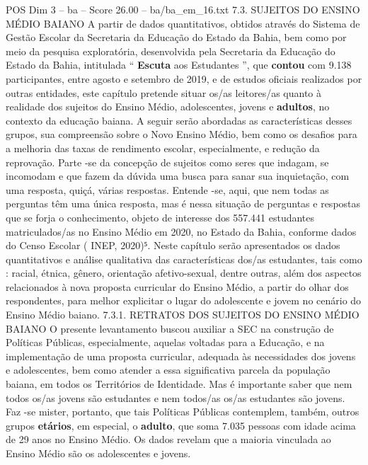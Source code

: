\begin{textsample}{POS Dim 3 – ba – Score 26.00 – ba/ba\_em\_16.txt}  \label{ex:f3_pos_172}
7.3.
SUJEITOS DO ENSINO MÉDIO BAIANO A partir de dados quantitativos, obtidos através do Sistema de Gestão Escolar da Secretaria da Educação do Estado da Bahia, bem como por meio da pesquisa exploratória, desenvolvida pela Secretaria da Educação do Estado da Bahia, intitulada “ \textbf{Escuta} aos Estudantes ”, que \textbf{contou} com 9.138 participantes, entre agosto e setembro de 2019, e de estudos oficiais realizados por outras entidades, este capítulo pretende situar os/as leitores/as quanto à realidade dos sujeitos do Ensino Médio, adolescentes, jovens e \textbf{adultos}, no contexto da educação baiana.
A seguir serão abordadas as características desses grupos, sua compreensão sobre o Novo Ensino Médio, bem como os desafios para a melhoria das taxas de rendimento escolar, especialmente, e redução da reprovação.
Parte -se da concepção de sujeitos como seres que indagam, se incomodam e que fazem da dúvida uma busca para sanar sua inquietação, com uma resposta, quiçá, várias respostas.
Entende -se, aqui, que nem todas as perguntas têm uma única resposta, mas é nessa situação de perguntas e respostas que se forja o conhecimento, objeto de interesse dos 557.441 estudantes matriculados/as no Ensino Médio em 2020, no Estado da Bahia, conforme dados do Censo Escolar ( INEP, 2020)⁵.
Neste capítulo serão apresentados os dados quantitativos e análise qualitativa das características dos/as estudantes, tais como : racial, étnica, gênero, orientação afetivo-sexual, dentre outras, além dos aspectos relacionados à nova proposta curricular do Ensino Médio, a partir do olhar dos respondentes, para melhor explicitar o lugar do adolescente e jovem no cenário do Ensino Médio baiano. 7.3.1.
RETRATOS DOS SUJEITOS DO ENSINO MÉDIO BAIANO O presente levantamento buscou auxiliar a SEC na construção de Políticas Públicas, especialmente, aquelas voltadas para a Educação, e na implementação de uma proposta curricular, adequada às necessidades dos jovens e adolescentes, bem como atender a essa significativa parcela da população baiana, em todos os Territórios de Identidade.
Mas é importante saber que nem todos os/as jovens são estudantes e nem todos/as os/as estudantes são jovens.
Faz -se mister, portanto, que tais Políticas Públicas contemplem, também, outros grupos \textbf{etários}, em especial, o \textbf{adulto}, que soma 7.035 pessoas com idade acima de 29 anos no Ensino Médio.
Os dados revelam que a maioria vinculada ao Ensino Médio são os adolescentes e jovens.

\end{textsample}
